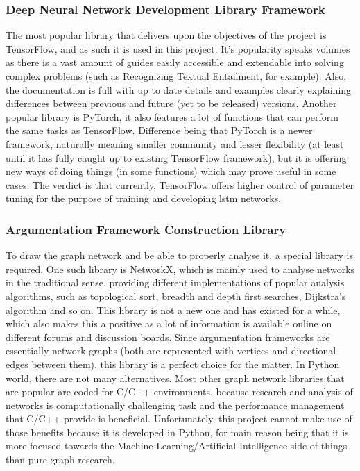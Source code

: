         \subsubsection{Deep Neural Network Development Library Framework}
            The most popular library that delivers upon the objectives of the project is TensorFlow, and as such it is used in this project. It's popularity speaks volumes as there is a vast amount of guides easily accessible and extendable into solving complex problems (such as Recognizing Textual Entailment, for example). Also, the documentation is full with up to date details and examples clearly explaining differences between previous and future (yet to be released) versions. Another popular library is PyTorch, it also features a lot of functions that can perform the same tasks as TensorFlow. Difference being that PyTorch is a newer framework, naturally meaning smaller community and lesser flexibility (at least until it has fully caught up to existing TensorFlow framework), but it is offering new ways of doing things (in some functions) which may prove useful in some cases. The verdict is that currently, TensorFlow offers higher control of parameter tuning for the purpose of training and developing \gls{lstm} networks.
            
        \subsubsection{Argumentation Framework Construction Library}
            To draw the graph network and be able to properly analyse it, a special library is required. One such library is NetworkX, which is mainly used to analyse networks in the traditional sense, providing different implementations of popular analysis algorithms, such as topological sort, breadth and depth first searches, Dijkstra's algorithm and so on. This library is not a new one and has existed for a while, which also makes this a positive as a lot of information is available online on different forums and discussion boards. Since argumentation frameworks are essentially network graphs (both are represented with vertices and directional edges between them), this library is a perfect choice for the matter. In Python world, there are not many alternatives. Most other graph network libraries that are popular are coded for C/C++ environments, because research and analysis of networks is computationally challenging task and the performance management that C/C++ provide is beneficial. Unfortunately, this project cannot make use of those benefits because it is developed in Python, for main reason being that it is more focused towards the Machine Learning/Artificial Intelligence side of things than pure graph research.
        
